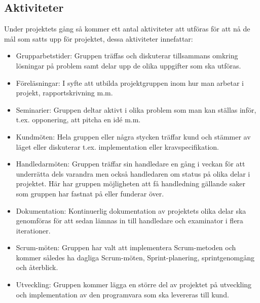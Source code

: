 \documentclass[a4paper,10pt]{article}
\begin{document}
\subsection{Aktiviteter}
Under projektets gång så kommer ett antal aktiviteter att utföras för att nå de mål som satts upp för projektet, dessa aktiviteter innefattar:
\begin{itemize}
\item Grupparbetstider: Gruppen träffas och diskuterar tillsammans omkring lösningar på problem samt delar upp de olika uppgifter som ska utföras.
\item Föreläsningar: I syfte att utbilda projektgruppen inom hur man arbetar i projekt, rapportskrivning m.m.
\item Seminarier: Gruppen deltar aktivt i olika problem som man kan ställas inför, t.ex. opponering, att pitcha en idé m.m.
\item Kundmöten: Hela gruppen eller några stycken träffar kund och stämmer av läget eller diskuterar t.ex. implementation eller kravspecifikation.
\item Handledarmöten: Gruppen träffar sin handledare en gång i veckan för att underrätta dels varandra men också handledaren om status på olika delar i projektet. Här har gruppen möjligheten att få handledning gällande saker som gruppen har fastnat på eller funderar över.
\item Dokumentation: Kontinuerlig dokumentation av projektets olika delar ska genomföras för att sedan lämnas in till handledare och examinator i flera iterationer.
\item Scrum-möten: Gruppen har valt att implementera Scrum-metoden och kommer således ha dagliga Scrum-möten, Sprint-planering, sprintgenomgång och återblick.
\item Utveckling: Gruppen kommer lägga en större del av projektet på utveckling och implementation av den programvara som ska levereras till kund.
\end{itemize}
\end{document}
